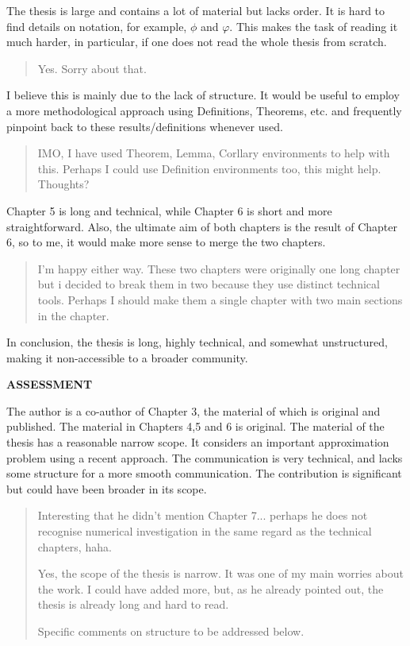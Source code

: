 \documentclass[a4paper]{article}
\begin{document}
The thesis is large and contains a lot of material but lacks order. It is hard to find
details on notation, for example, \(\phi\) and \(\varphi\). This makes the task of reading it much
harder, in particular, if one does not read the whole thesis from scratch.
\begin{quote}
    Yes. Sorry about that. 
\end{quote}

I believe this is mainly due to the lack of structure. It would be useful to employ
a more methodological approach using Definitions, Theorems, etc. and frequently
pinpoint back to these results/definitions whenever used.
\begin{quote}
    IMO, I have used Theorem, Lemma, Corllary environments to help with this. Perhaps I could use Definition environments too, this might help. Thoughts? 
\end{quote}

Chapter 5 is long and technical, while Chapter 6 is short and more straightforward.
Also, the ultimate aim of both chapters is the result of Chapter 6, so to me, it would
make more sense to merge the two chapters.
\begin{quote}
    I'm happy either way. These two chapters were originally one long chapter but i decided to break them in two because they use distinct technical tools. Perhaps I should make them a single chapter with two main sections in the chapter.
\end{quote}

In conclusion, the thesis is long, highly technical, and somewhat unstructured, making it non-accessible to a broader community.

\noindent\textbf{ASSESSMENT}

The author is a co-author of Chapter 3, the material of which is original and published. The material in Chapters 4,5 and 6 is original. The material of the thesis has a
reasonable narrow scope. It considers an important approximation problem using a
recent approach. The communication is very technical, and lacks some structure for
a more smooth communication. The contribution is significant but could have been
broader in its scope.
\begin{quote}
    Interesting that he didn't mention Chapter 7... perhaps he does not recognise numerical investigation in the same regard as the technical chapters, haha. 

    Yes, the scope of the thesis is narrow. It was one of my main worries about the work. I could have added more, but, as he already pointed out, the thesis is already long and hard to read. 

    Specific comments on structure to be addressed below. 
\end{quote}
\end{document}
